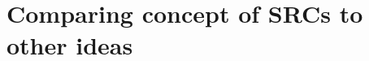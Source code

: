 \documentclass{article}
\begin{document}


\section{Comparing concept of SRCs to other ideas}



\ 

\newpage
\end{document}
